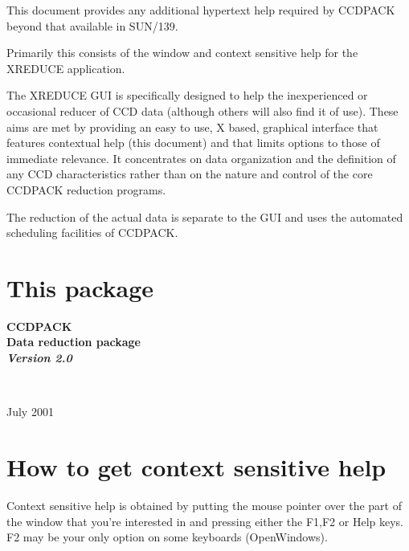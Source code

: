 \documentclass[11pt]{article}
\newcommand{\stardocinitials}  {HRH}
\newcommand{\stardocnumber}    {1.0}
\newcommand{\stardocdate}      {July 2001}
\newcommand{\stardocname}{\stardocinitials /\stardocnumber}
\newcommand{\htmladdimg}[1]{}
\newenvironment{latexonly}{}{}
\newcommand{\xref}[3]{#1}
\newcommand{\xlabel}[1]{}
\newcommand{\latexonlytoc}[0]{\tableofcontents}
\begin{document}
This document provides any additional hypertext help required by
\xref{CCDPACK}{sun139}{} beyond that available in SUN/139.

Primarily this consists of the window and context sensitive help
for the \xref{XREDUCE}{sun139}{XREDUCE} application.

The XREDUCE GUI is specifically designed to help the inexperienced or
occasional reducer of CCD data (although others will also find it of
use). These aims are met by providing an easy to use, X based,
graphical interface that features contextual help (this document) and
that limits options to those of immediate relevance. It concentrates
on data organization and the definition of any CCD characteristics
rather than on the nature and control of the core CCDPACK reduction
programs.

The reduction of the actual data is separate to the GUI and uses the
automated scheduling facilities of CCDPACK.


\begin{latexonly}
  \setlength{\parskip}{0mm}
  \latexonlytoc
  \setlength{\parskip}{\medskipamount}
  \markright{\stardocname}
\end{latexonly}
\section{This package \xlabel{OnVersion}}
\begin{center}
\begin{latexonly}
{\Huge \bf  CCDPACK \\
\LARGE Data reduction package \\
\Large \em Version 2.0 \\
}
\end{latexonly}
\begin{htmlonly}
   \htmladdimg{ccdv2.gif} \\
\end{htmlonly}
\stardocdate
\end{center}

\section{How to get context sensitive help \xlabel{OnContext}}
Context sensitive help is obtained by putting the mouse pointer over
the part of the window that you're interested in and pressing either
the F1,F2 or Help keys. F2 may be your only option on some keyboards
(OpenWindows).
\end{document}
